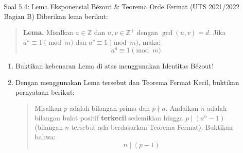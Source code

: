 \documentclass[11pt,a4paper]{article}
\begin{document}
\vspace{0.4cm}

\begin{soalbox}{Soal 5.4: Lema Eksponensial B\'ezout \& Teorema Orde Fermat (UTS 2021/2022 Bagian B)}
Diberikan lema berikut:
\begin{quote}
\textbf{Lema.} Misalkan $a \in \mathbb{Z}$ dan $u, v \in \mathbb{Z}^+$ dengan $\gcd(u, v) = d$. Jika $a^u \equiv 1 \pmod m$ dan $a^v \equiv 1 \pmod m$, maka:
\[
a^d \equiv 1 \pmod m
\]
\end{quote}
\begin{enumerate}[label=(\alph*)]
    \item Buktikan kebenaran Lema di atas menggunakan Identitas B\'ezout!
    \item Dengan menggunakan Lema tersebut dan Teorema Fermat Kecil, buktikan pernyataan berikut:
    \begin{quote}
    Misalkan $p$ adalah bilangan prima dan $p \nmid a$. Andaikan $n$ adalah bilangan bulat positif \textbf{terkecil} sedemikian hingga $p \mid (a^n - 1)$ (bilangan $n$ tersebut ada berdasarkan Teorema Fermat). Buktikan bahwa:
    \[
    n \mid (p - 1)
    \]
    \end{quote}
\end{enumerate}
\end{soalbox}
\end{document}

